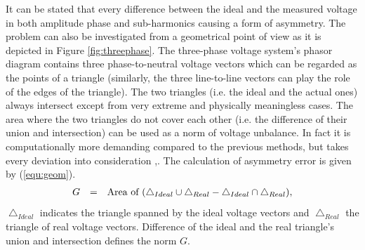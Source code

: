 
            It can be stated that every difference between the ideal and the measured voltage in both amplitude phase and sub-harmonics causing a form of asymmetry. The problem can also be investigated from a geometrical point of view as it is depicted in Figure \ref{fig:threephase}. The three-phase voltage system's phasor diagram contains three  phase-to-neutral voltage vectors which can be regarded as the points of a triangle (similarly, the three line-to-line vectors can play the role of the edges of the triangle). The two triangles (i.e. the ideal and the actual ones) always intersect except from very extreme and physically meaningless cases. The area where the two triangles do not cover each other (i.e. the difference of their union and intersection) can be used as a norm of voltage unbalance. In fact it is computationally more demanding compared to the previous methods, but takes every deviation into consideration \cite{Neukirchner2015},\cite{neukirchner2015examination}. The calculation of asymmetry error is given by (\ref{equ:geom}).
            \begin{equation}
                \begin{array}{rcl}
                       G&=&\textnormal{Area of }(\bigtriangleup_{Ideal}\cup\bigtriangleup_{Real}-\bigtriangleup_{Ideal}\cap\bigtriangleup_{Real}),
                \end{array}
                \label{equ:geom}
            \end{equation}
            $\bigtriangleup_{Ideal}$ indicates the triangle spanned by the ideal voltage vectors and $\bigtriangleup_{Real}$ the triangle of real voltage vectors. Difference of the ideal and the real triangle's union and intersection defines the norm $G$.

